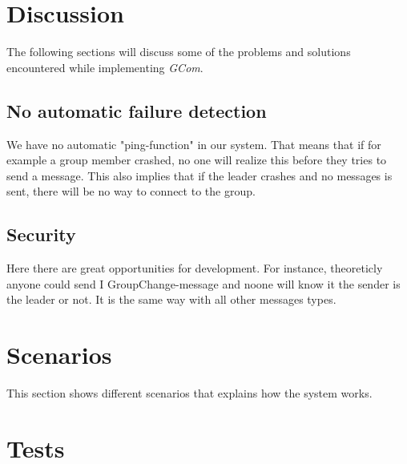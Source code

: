\documentclass[titlepage, twocolumn, a4paper, 10pt]{article}
\begin{document}
\section{Discussion}\label{sec:discussion}
The following sections will discuss some of the problems and solutions
encountered while implementing \textit{GCom}.


\subsection{No automatic failure detection}\label{sec:no-automatic-failure-detection}
We have no automatic "ping-function" in our system. That means that if for example
a group member crashed, no one will realize this before they tries to send a message. This also
implies that if the leader crashes and no messages is sent, there will be no way to connect to the group.

\subsection{Security}\label{sec:security}
Here there are great opportunities for development. For instance, theoreticly anyone could send I 
GroupChange-message and noone will know it the sender is the leader or not. It is the same way 
with all other messages types.

\section{Scenarios}\label{sec:scenarios}
This section shows different scenarios that explains how the system
works.


\section{Tests}\label{sec:tests}
\end{document}
